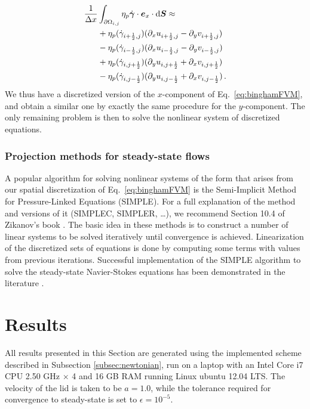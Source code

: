 \documentclass[final,3p,twocolumn]{elsarticle}
\begin{document}
\begin{align}
    \nonumber 
    \frac{1}{\Delta x} &\int_{\partial \Omega_{i,j}} \eta_p \dot{\bm{\gamma}}
    \cdot \bm{e}_x \cdot {\rm d}\bm{S} \approx \\ 
    \nonumber 
    &+ \eta_p (\dot{\gamma}_{i+\frac{1}{2},j}) (\partial_x
    u_{i+\frac{1}{2},j} - \partial_y v_{i+\frac{1}{2},j}) \\
    \nonumber 
    &- \eta_p (\dot{\gamma}_{i-\frac{1}{2},j}) (\partial_x
    u_{i-\frac{1}{2},j} - \partial_y v_{i-\frac{1}{2},j}) \\
    \nonumber 
    &+ \eta_p (\dot{\gamma}_{i,j+\frac{1}{2}}) (\partial_y
    u_{i,j+\frac{1}{2}} + \partial_x v_{i,j+\frac{1}{2}}) \\
    &- \eta_p (\dot{\gamma}_{i,j-\frac{1}{2}}) (\partial_y
    u_{i,j-\frac{1}{2}} + \partial_x v_{i,j-\frac{1}{2}}) \,.
\end{align}
%
We thus have a discretized version of the $x$-component of Eq.\
\eqref{eq:binghamFVM}, and obtain a similar one by exactly the same procedure
for the $y$-component. The only remaining problem is then to solve the
nonlinear system of discretized equations. 

\subsubsection{Projection methods for steady-state flows}

A popular algorithm for solving nonlinear systems of the form that arises from
our spatial discretization of Eq.\ \eqref{eq:binghamFVM} is the Semi-Implicit
Method for Pressure-Linked Equations (SIMPLE). For a full explanation of the
method and versions of it (SIMPLEC, SIMPLER, \ldots), we recommend Section 10.4
of Zikanov's book \cite{zikanov2010essential}. The basic idea in these methods
is to construct a number of linear systems to be solved iteratively until
convergence is achieved. Linearization of the discretized sets of equations is
done by computing some terms with values from previous iterations.  Successful
implementation of the SIMPLE algorithm to solve the steady-state Navier-Stokes
equations has been demonstrated in the literature \cite{syrakos2013solution}.

\section{Results}
\label{sec:results}

All results presented in this Section are generated using the implemented
scheme described in Subsection \ref{subsec:newtonian}, run on a laptop with an
Intel Core i7 CPU \@ 2.50 GHz $\times$ 4 and 16 GB RAM running Linux ubuntu
12.04 LTS. The velocity of the lid is taken to be $a=1.0$, while the tolerance
required for convergence to steady-state is set to $\epsilon=10^{-5}$. 
\end{document}
